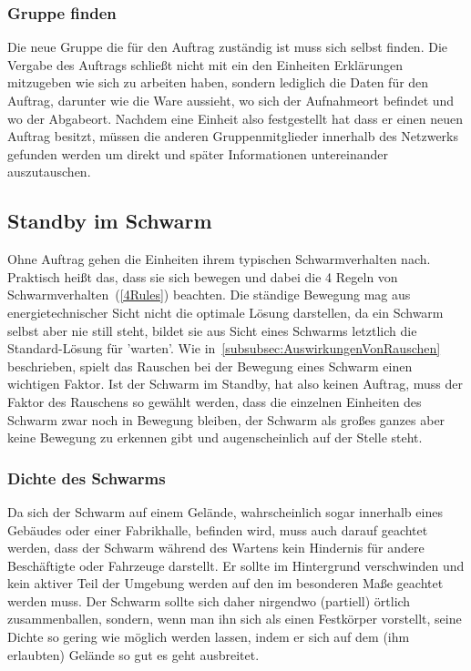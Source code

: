\subsubsection*{Gruppe finden}
Die neue Gruppe die für den Auftrag zuständig ist muss sich selbst finden.
Die Vergabe des Auftrags schließt nicht mit ein den Einheiten Erklärungen mitzugeben wie sich zu arbeiten haben, sondern lediglich die Daten für den Auftrag, darunter wie die Ware aussieht, wo sich der Aufnahmeort befindet und wo der Abgabeort.
Nachdem eine Einheit also festgestellt hat dass er einen neuen Auftrag besitzt, müssen die anderen Gruppenmitglieder innerhalb des Netzwerks gefunden werden um direkt und später Informationen untereinander auszutauschen.

\subsection*{Standby im Schwarm}\label{subsec:StandbyImSchwarm}
Ohne Auftrag gehen die Einheiten ihrem typischen Schwarmverhalten nach. Praktisch heißt das, dass sie sich bewegen und dabei die 4 Regeln von Schwarmverhalten~(\autoref{4Rules}) beachten.
Die ständige Bewegung mag aus energietechnischer Sicht nicht die optimale Lösung darstellen, da ein Schwarm selbst aber nie still steht, bildet sie aus Sicht eines Schwarms letztlich die Standard-Lösung für 'warten'.
Wie in~\autoref{subsubsec:AuswirkungenVonRauschen} beschrieben, spielt das Rauschen bei der Bewegung eines Schwarm einen wichtigen Faktor.
Ist der Schwarm im Standby, hat also keinen Auftrag, muss der Faktor des Rauschens so gewählt werden, dass die einzelnen Einheiten des Schwarm zwar noch in Bewegung bleiben, der Schwarm als großes ganzes aber keine Bewegung zu erkennen gibt und augenscheinlich auf der Stelle steht.

\subsubsection*{Dichte des Schwarms}\label{subsubsec:DichteDesSchwarms}
Da sich der Schwarm auf einem Gelände, wahrscheinlich sogar innerhalb eines Gebäudes oder einer Fabrikhalle, befinden wird, muss auch darauf geachtet werden, dass der Schwarm während des Wartens kein Hindernis für andere Beschäftigte oder Fahrzeuge darstellt.
Er sollte im Hintergrund verschwinden und kein aktiver Teil der Umgebung werden auf den im besonderen Maße geachtet werden muss.
Der Schwarm sollte sich daher nirgendwo (partiell) örtlich zusammenballen, sondern, wenn man ihn sich als einen Festkörper vorstellt, seine Dichte so gering wie möglich werden lassen, indem er sich auf dem (ihm erlaubten) Gelände so gut es geht ausbreitet.

